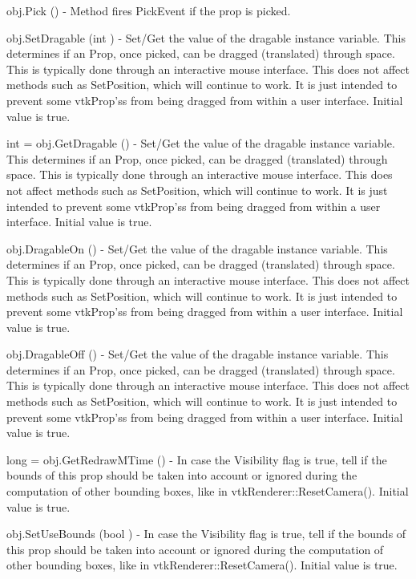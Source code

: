 \begin{DoxyItemize}
\item {\ttfamily obj.\-Pick ()} -\/ Method fires Pick\-Event if the prop is picked.  
\item {\ttfamily obj.\-Set\-Dragable (int )} -\/ Set/\-Get the value of the dragable instance variable. This determines if an Prop, once picked, can be dragged (translated) through space. This is typically done through an interactive mouse interface. This does not affect methods such as Set\-Position, which will continue to work. It is just intended to prevent some vtk\-Prop'ss from being dragged from within a user interface. Initial value is true.  
\item {\ttfamily int = obj.\-Get\-Dragable ()} -\/ Set/\-Get the value of the dragable instance variable. This determines if an Prop, once picked, can be dragged (translated) through space. This is typically done through an interactive mouse interface. This does not affect methods such as Set\-Position, which will continue to work. It is just intended to prevent some vtk\-Prop'ss from being dragged from within a user interface. Initial value is true.  
\item {\ttfamily obj.\-Dragable\-On ()} -\/ Set/\-Get the value of the dragable instance variable. This determines if an Prop, once picked, can be dragged (translated) through space. This is typically done through an interactive mouse interface. This does not affect methods such as Set\-Position, which will continue to work. It is just intended to prevent some vtk\-Prop'ss from being dragged from within a user interface. Initial value is true.  
\item {\ttfamily obj.\-Dragable\-Off ()} -\/ Set/\-Get the value of the dragable instance variable. This determines if an Prop, once picked, can be dragged (translated) through space. This is typically done through an interactive mouse interface. This does not affect methods such as Set\-Position, which will continue to work. It is just intended to prevent some vtk\-Prop'ss from being dragged from within a user interface. Initial value is true.  
\item {\ttfamily long = obj.\-Get\-Redraw\-M\-Time ()} -\/ In case the Visibility flag is true, tell if the bounds of this prop should be taken into account or ignored during the computation of other bounding boxes, like in vtk\-Renderer\-::\-Reset\-Camera(). Initial value is true.  
\item {\ttfamily obj.\-Set\-Use\-Bounds (bool )} -\/ In case the Visibility flag is true, tell if the bounds of this prop should be taken into account or ignored during the computation of other bounding boxes, like in vtk\-Renderer\-::\-Reset\-Camera(). Initial value is true.  

\end{DoxyItemize}
